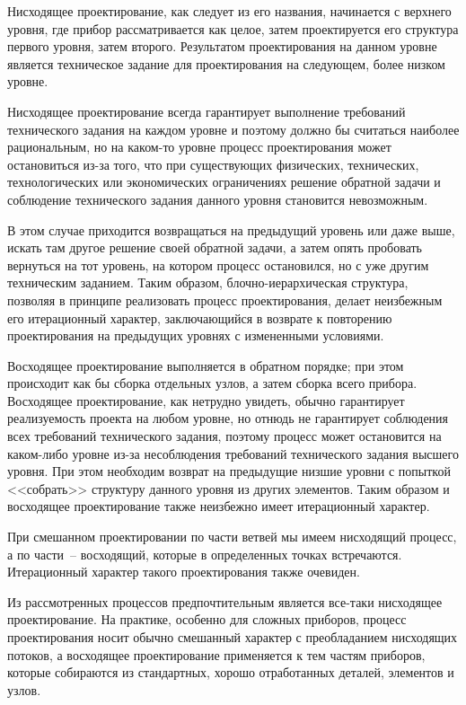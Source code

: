 Нисходящее проектирование, как следует из его названия, начинается с верхнего уровня, где прибор рассматривается как целое, затем проектируется его структура первого уровня, затем второго. Результатом проектирования на данном уровне является техническое задание для проектирования на следующем, более низком уровне.

Нисходящее проектирование всегда гарантирует выполнение требований технического задания на каждом уровне и поэтому должно бы считаться наиболее рациональным, но на каком-то уровне процесс проектирования может остановиться из-за того, что при существующих физических, технических, технологических или экономических ограничениях решение обратной задачи и соблюдение технического задания данного уровня становится невозможным. 

В этом случае приходится возвращаться на предыдущий уровень или даже выше, искать там другое решение своей обратной задачи, а затем опять пробовать вернуться на тот уровень, на котором процесс остановился, но с уже другим техническим заданием. Таким образом, блочно-иерархическая структура, позволяя в принципе реализовать процесс проектирования, делает неизбежным его итерационный характер, заключающийся в возврате к повторению проектирования на предыдущих уровнях с измененными условиями.

Восходящее проектирование выполняется в обратном порядке; при этом происходит как бы сборка отдельных узлов, а затем сборка всего прибора. Восходящее проектирование, как нетрудно увидеть, обычно гарантирует реализуемость проекта на любом уровне, но отнюдь не гарантирует соблюдения всех требований технического задания, поэтому процесс может остановится на каком-либо уровне из-за несоблюдения требований технического задания высшего уровня. При этом необходим возврат на предыдущие низшие уровни с попыткой <<собрать>> структуру данного уровня из других элементов. Таким образом и восходящее проектирование также неизбежно имеет итерационный характер.

При смешанном проектировании по части ветвей мы имеем нисходящий процесс, а по части~-- восходящий, которые в определенных точках встречаются. Итерационный характер такого проектирования также очевиден.

Из рассмотренных процессов предпочтительным является все-таки нисходящее проектирование. На практике, особенно для сложных приборов, процесс проектирования носит обычно смешанный характер с преобладанием нисходящих потоков, а восходящее проектирование применяется к тем частям приборов, которые собираются из стандартных, хорошо отработанных деталей, элементов и узлов.

